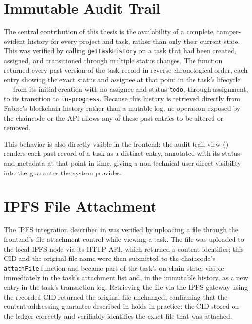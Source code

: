 \section{Immutable Audit Trail}
\label{sec:results-audit}

The central contribution of this thesis is the availability of a complete, tamper-evident history for every project and task, rather than only their current state. This was verified by calling \texttt{getTaskHistory} on a task that had been created, assigned, and transitioned through multiple status changes. The function returned every past version of the task record in reverse chronological order, each entry showing the exact status and assignee at that point in the task's lifecycle — from its initial creation with no assignee and status \texttt{todo}, through assignment, to its transition to \texttt{in-progress}. Because this history is retrieved directly from Fabric's blockchain history rather than a mutable log, no operation exposed by the chaincode or the API allows any of these past entries to be altered or removed.

This behavior is also directly visible in the frontend: the audit trail view () renders each past record of a task as a distinct entry, annotated with its status and metadata at that point in time, giving a non-technical user direct visibility into the guarantee the system provides.

\section{IPFS File Attachment}
\label{sec:results-ipfs}

The IPFS integration described in  was verified by uploading a file through the frontend's file attachment control while viewing a task. The file was uploaded to the local IPFS node via its HTTP API, which returned a content identifier; this CID and the original file name were then submitted to the chaincode's \texttt{attachFile} function and became part of the task's on-chain state, visible immediately in the task's attachment list and, in the immutable history, as a new entry in the task's transaction log. Retrieving the file via the IPFS gateway using the recorded CID returned the original file unchanged, confirming that the content-addressing guarantee described in  holds in practice: the CID stored on the ledger correctly and verifiably identifies the exact file that was attached.

